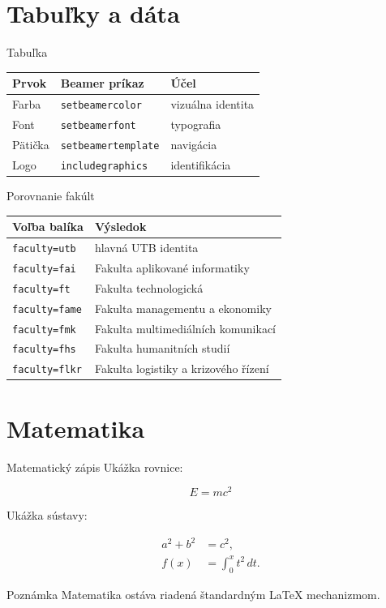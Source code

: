 \documentclass[aspectratio=169]{beamer}
\begin{document}
	\section{Tabuľky a dáta}
	
	\begin{frame}{Tabuľka}
		\begin{table}
			\centering
			\begin{tabular}{lll}
				\toprule
				Prvok & Beamer príkaz & Účel \\
				\midrule
				Farba & \texttt{setbeamercolor} & vizuálna identita \\
				Font & \texttt{setbeamerfont} & typografia \\
				Pätička & \texttt{setbeamertemplate} & navigácia \\
				Logo & \texttt{includegraphics} & identifikácia \\
				\bottomrule
			\end{tabular}
		\end{table}
	\end{frame}
	
	\begin{frame}{Porovnanie fakúlt}
		\begin{tabular}{ll}
			\toprule
			Voľba balíka & Výsledok \\
			\midrule
			\texttt{faculty=utb} & hlavná UTB identita \\
			\texttt{faculty=fai} & Fakulta aplikované informatiky \\
			\texttt{faculty=ft} & Fakulta technologická \\
			\texttt{faculty=fame} & Fakulta managementu a ekonomiky \\
			\texttt{faculty=fmk} & Fakulta multimediálních komunikací \\
			\texttt{faculty=fhs} & Fakulta humanitních studií \\
			\texttt{faculty=flkr} & Fakulta logistiky a krizového řízení \\
			\bottomrule
		\end{tabular}
	\end{frame}
	
	\section{Matematika}
	
	\begin{frame}{Matematický zápis}
		Ukážka rovnice:
		
		\[
		E = mc^2
		\]
		
		Ukážka sústavy:
		
		\[
		\begin{aligned}
			a^2 + b^2 &= c^2, \\
			f(x) &= \int_0^x t^2 \, dt.
		\end{aligned}
		\]
		
		\begin{block}{Poznámka}
			Matematika ostáva riadená štandardným LaTeX mechanizmom.
		\end{block}
	\end{frame}
	
\end{document}
